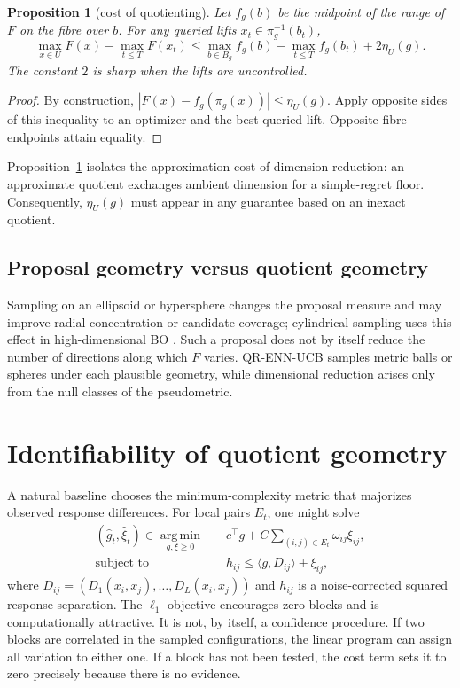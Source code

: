 \documentclass[11pt]{article}
\newtheorem{proposition}[theorem]{Proposition}
\theoremstyle{definition}
\theoremstyle{remark}
\newcommand{\1}{\mathbf 1}
\newcommand{\argmin}{\operatorname*{arg\,min}}
\begin{document}
\begin{proposition}[cost of quotienting]\label{prop:quotient-cost}
Let $f_g(b)$ be the midpoint of the range of $F$ on the fibre over $b$.  For any queried lifts
$x_t\in\pi_g^{-1}(b_t)$,
\begin{equation}\label{eq:quotient-regret}
 \max_{x\in U}F(x)-\max_{t\le T}F(x_t)
 \le
 \max_{b\in B_g}f_g(b)-\max_{t\le T}f_g(b_t)+2\eta_U(g).
\end{equation}
The constant $2$ is sharp when the lifts are uncontrolled.
\end{proposition}
\begin{proof}
By construction, $|F(x)-f_g(\pi_g(x))|\le\eta_U(g)$.  Apply opposite sides of this inequality
to an optimizer and the best queried lift.  Opposite fibre endpoints attain equality.
\end{proof}

Proposition~\ref{prop:quotient-cost} isolates the approximation cost of dimension reduction: an
approximate quotient exchanges ambient dimension for a simple-regret floor.  Consequently,
$\eta_U(g)$ must appear in any guarantee based on an inexact quotient.

\subsection{Proposal geometry versus quotient geometry}

Sampling on an ellipsoid or hypersphere changes the proposal measure and may improve radial
concentration or candidate coverage; cylindrical sampling uses this effect in high-dimensional BO
\cite{CylTS}.  Such a proposal does not by itself reduce the number of directions along which $F$
varies.  QR-ENN-UCB samples metric balls or spheres under each plausible geometry, while dimensional
reduction arises only from the null classes of the pseudometric.

\section{Identifiability of quotient geometry}

A natural baseline chooses the minimum-complexity metric that majorizes observed response differences.
For local pairs $E_t$, one might solve
\begin{equation}\label{eq:point-lp}
\begin{aligned}
  (\widehat g_t,\widehat\xi_t)\in\argmin_{g,\xi\ge0}\quad&
  c^\top g+C\sum_{(i,j)\in E_t}\omega_{ij}\xi_{ij},\\
  \text{subject to}\quad&
  h_{ij}\le \langle g,D_{ij}\rangle+\xi_{ij},
\end{aligned}
\end{equation}
where $D_{ij}=(D_1(x_i,x_j),\ldots,D_L(x_i,x_j))$ and $h_{ij}$ is a
noise-corrected squared response separation.  The $\ell_1$ objective encourages zero blocks and is
computationally attractive.  It is not, by itself, a confidence procedure.  If two blocks are
correlated in the sampled configurations, the linear program can assign all variation to either one.  If a
block has not been tested, the cost term sets it to zero precisely because there is no evidence.
\end{document}
